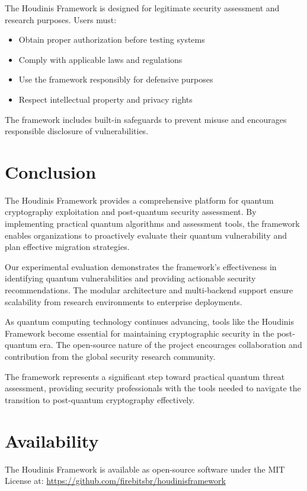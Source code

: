 \documentclass[11pt]{article}
\begin{document}
The Houdinis Framework is designed for legitimate security assessment and research purposes. Users must:

\begin{itemize}
\item Obtain proper authorization before testing systems
\item Comply with applicable laws and regulations
\item Use the framework responsibly for defensive purposes
\item Respect intellectual property and privacy rights
\end{itemize}

The framework includes built-in safeguards to prevent misuse and encourages responsible disclosure of vulnerabilities.

\section{Conclusion}

The Houdinis Framework provides a comprehensive platform for quantum cryptography exploitation and post-quantum security assessment. By implementing practical quantum algorithms and assessment tools, the framework enables organizations to proactively evaluate their quantum vulnerability and plan effective migration strategies.

Our experimental evaluation demonstrates the framework's effectiveness in identifying quantum vulnerabilities and providing actionable security recommendations. The modular architecture and multi-backend support ensure scalability from research environments to enterprise deployments.

As quantum computing technology continues advancing, tools like the Houdinis Framework become essential for maintaining cryptographic security in the post-quantum era. The open-source nature of the project encourages collaboration and contribution from the global security research community.

The framework represents a significant step toward practical quantum threat assessment, providing security professionals with the tools needed to navigate the transition to post-quantum cryptography effectively.

\section{Availability}

The Houdinis Framework is available as open-source software under the MIT License at:
\url{https://github.com/firebitsbr/houdinisframework}
\end{document}
